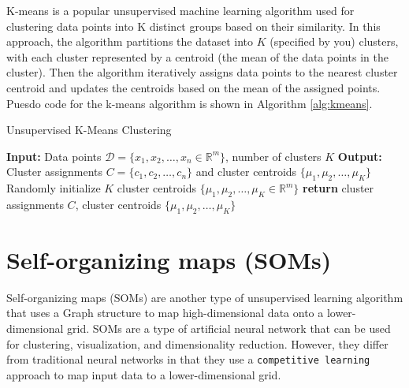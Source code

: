 \documentclass{article}[12pt]
\newcommand{\norm}[1]{\left|\left|#1\right|\right|}
\DeclareMathOperator*{\argmin}{arg\,min}
\begin{document}
K-means is a popular unsupervised machine learning algorithm used for clustering data points into K distinct groups based on their similarity.
In this approach, the algorithm partitions the dataset into $K$ (specified by you) clusters, 
with each cluster represented by a centroid (the mean of the data points in the cluster). 
Then the algorithm iteratively assigns data points to the nearest cluster centroid and updates the centroids based on the mean of the assigned points.
Puesdo code for the k-means algorithm is shown in Algorithm \ref{alg:kmeans}.

\begin{algorithm}[H]
   \begin{algorithmic}[1]
   \caption{Unsupervised K-Means Clustering}\label{alg:kmeans}
   \State \textbf{Input:} Data points $\mathcal{D} = \{x_1, x_2, \ldots, x_n\in\mathbb{R}^{m}\}$, number of clusters $K$
   \State \textbf{Output:} Cluster assignments $C = \{c_1, c_2, \ldots, c_n\}$ and cluster centroids $\{\mu_1, \mu_2, \ldots, \mu_K\}$
   \State Randomly initialize $K$ cluster centroids $\{\mu_1, \mu_2, \ldots, \mu_K\in\mathbb{R}^{m}\}$
      \State{$c_{i}\gets\underset{j}\argmin \norm{x_{i} - \mu_j}^2$}
   \EndFor 
   \State{$\hat{\mu}\gets\mu$}
   \EndFor
   \If{$\norm{\mu - \hat{\mu}} < \epsilon$}
   \EndIf
   \EndWhile
   \State \textbf{return} cluster assignments $C$, cluster centroids $\{\mu_1, \mu_2, \ldots, \mu_K\}$
   \end{algorithmic}
\end{algorithm}



\section{Self-organizing maps (SOMs)}
Self-organizing maps (SOMs) are another type of unsupervised learning algorithm that uses a Graph structure to map high-dimensional data onto a lower-dimensional grid.
SOMs are a type of artificial neural network that can be used for clustering, visualization, and dimensionality reduction. 
However, they differ from traditional neural networks in that they use a \texttt{competitive learning} approach to map input data to a lower-dimensional grid.
\end{document}
